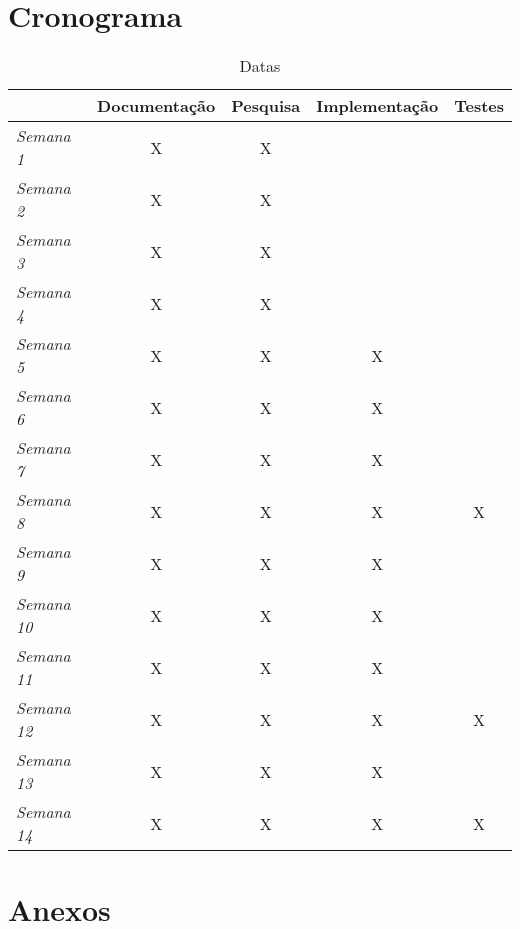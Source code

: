 \documentclass[12pt,oneside,a4paper,article]{abntex2}
\begin{document}
\part{Cronograma}

\begin{table}[]
	\centering
	\caption{Datas}
	\label{my-label}
	\begin{tabular}{|l|c|c|c|c|}
		\hline
		& \multicolumn{1}{l|}{\textbf{Documentação}} & \multicolumn{1}{l|}{\textbf{Pesquisa}} & \multicolumn{1}{l|}{\textbf{Implementação}} & \multicolumn{1}{l|}{\textbf{Testes}} \\ \hline
		\textit{Semana 1} 
		 & X & X& \multicolumn{1}{l|}{} &\multicolumn{1}{l|}{}                  \\ \hline
		\textit{Semana 2}  & X & X &   &   \\ \hline
		\textit{Semana 3}  & X & X &   &   \\ \hline
		\textit{Semana 4}  & X & X &   &   \\ \hline
		\textit{Semana 5}  & X & X & X &   \\ \hline
		\textit{Semana 6}  & X & X & X &   \\ \hline
		\textit{Semana 7}  & X & X & X &   \\ \hline
		\textit{Semana 8}  & X & X & X & X \\ \hline
		\textit{Semana 9}  & X & X & X &   \\ \hline
		\textit{Semana 10} & X & X & X &   \\ \hline
		\textit{Semana 11} & X & X & X &   \\ \hline
		\textit{Semana 12} & X & X & X & X \\ \hline
		\textit{Semana 13} & X & X & X &   \\ \hline
		\textit{Semana 14} & X & X & X & X \\ \hline
	\end{tabular}
	
\end{table}

\part*{Anexos}

\end{document}
